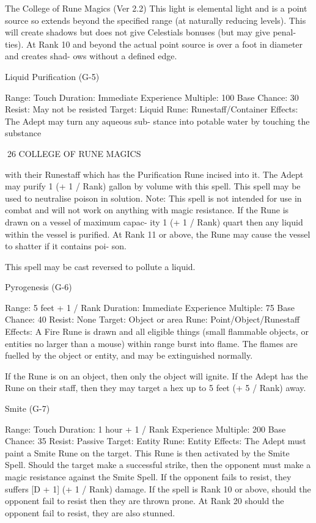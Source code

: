 \begin{Chapter}{The College of Rune Magics (Ver 2.2)}
This light is elemental light and is a point source so 
extends  beyond  the  specified  range  (at  naturally 
reducing levels). This will create shadows but does 
not  give  Celestials  bonuses  (but  may  give  penal-
ties).  At  Rank  10  and  beyond  the  actual  point 
source is over a foot in diameter and creates shad-
ows without a defined edge. 

Liquid Purification (G-5) 

Range: Touch 
Duration: Immediate 
Experience Multiple: 100 
Base Chance: 30%
Resist: May not be resisted 
Target: Liquid 
Rune: Runestaff/Container 
Effects:  The  Adept  may  turn  any  aqueous  sub-
stance into potable water by touching the substance 

26 COLLEGE OF RUNE MAGICS 

with  their  Runestaff  which  has  the  Purification 
Rune incised into it. The Adept may purify 1 (+ 1 / 
Rank) gallon by volume  with this spell.  This spell 
may be used to neutralise poison in solution. Note: 
This  spell  is  not  intended  for  use  in  combat  and 
will not work on anything with magic resistance. If 
the Rune is drawn on a vessel of maximum capac-
ity 1 (+ 1 / Rank) quart then any liquid within the 
vessel  is  purified.  At  Rank  11  or  above,  the  Rune 
may  cause  the  vessel  to  shatter  if  it  contains  poi-
son. 

This spell may be cast reversed to pollute a liquid. 

Pyrogenesis (G-6) 

Range: 5 feet + 1 / Rank 
Duration: Immediate 
Experience Multiple: 75 
Base Chance: 40%
Resist: None 
Target: Object or area 
Rune: Point/Object/Runestaff 
Effects:  A  Fire  Rune  is  drawn  and  all  eligible 
things  (small  flammable  objects,  or  entities  no 
larger than a mouse) within range burst into flame. 
The flames are fuelled by the object or entity, and 
may be extinguished normally. 

If  the  Rune  is  on  an  object,  then  only  the  object 
will ignite. If the Adept has the Rune on their staff, 
then they may target a hex up to 5 feet (+ 5 / Rank) 
away. 

Smite (G-7) 

Range: Touch 
Duration: 1 hour + 1 / Rank 
Experience Multiple: 200 
Base Chance: 35%
Resist: Passive 
Target: Entity  
Rune: Entity 
Effects: The Adept must paint a Smite Rune on the 
target.  This  Rune  is  then  activated  by  the  Smite 
Spell.  Should  the  target  make  a  successful  strike, 
then  the  opponent  must  make  a  magic  resistance 
against  the  Smite  Spell.  If  the  opponent  fails  to 
resist, they suffers [D + 1] (+ 1 / Rank) damage. If 
the spell is Rank 10 or above, should the opponent 
fail  to  resist  then  they  are  thrown  prone.  At  Rank 
20 should the opponent fail to resist, they are also 
stunned. 


\end{Chapter}
